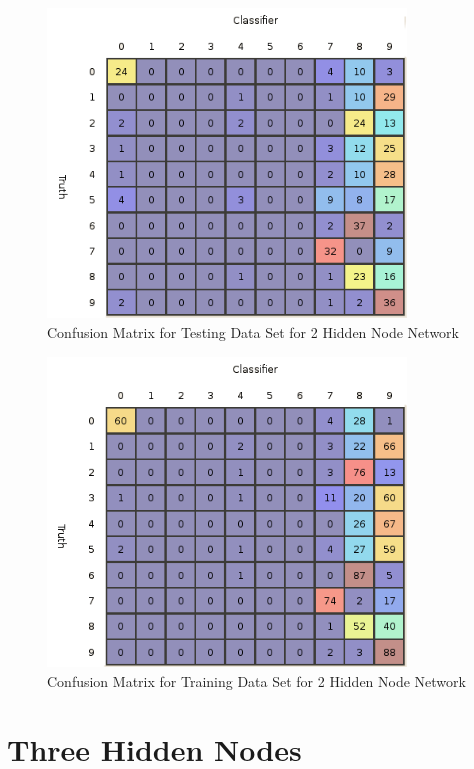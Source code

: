 \documentclass{article}
\begin{document}
\begin{figure}
\centering
\includegraphics[width=0.85\textwidth]{data/final/2_test_confusion.png}
\caption{Confusion Matrix for Testing Data Set for 2 Hidden Node Network}
\label{testconfusion2}
\end{figure}

\begin{figure}
\centering
\includegraphics[width=0.85\textwidth]{data/final/2_train_confusion.png}
\caption{Confusion Matrix for Training Data Set for 2 Hidden Node Network}
\label{trainconfusion2}
\end{figure}

\section{Three Hidden Nodes}\label{hidden3}
\end{document}

